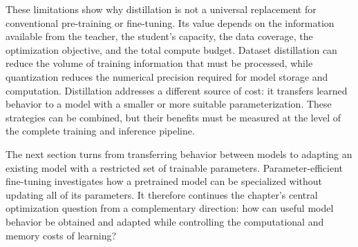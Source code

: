 These limitations show why distillation is not a universal replacement for
conventional pre-training or fine-tuning.  Its value depends on the
information available from the teacher, the student's capacity, the data
coverage, the optimization objective, and the total compute budget.  Dataset
distillation can reduce the volume of training information that must be
processed, while quantization reduces the numerical precision required for
model storage and computation.  Distillation addresses a different source
of cost: it transfers learned behavior to a model with a smaller or more
suitable parameterization.  These strategies can be combined, but their
benefits must be measured at the level of the complete training and
inference pipeline.

The next section turns from transferring behavior between models to
adapting an existing model with a restricted set of trainable parameters.
Parameter-efficient fine-tuning investigates how a pretrained model can be
specialized without updating all of its parameters.  It therefore continues
the chapter's central optimization question from a complementary direction:
how can useful model behavior be obtained and adapted while controlling the
computational and memory costs of learning?
